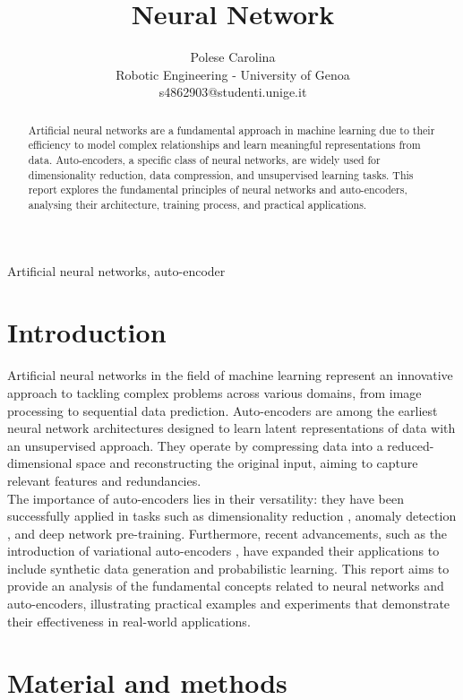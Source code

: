\documentclass[9pt,technote]{IEEEtran}
\title{Neural Network}
\author{
	Polese Carolina\\
	Robotic Engineering - University of Genoa\\
	s4862903@studenti.unige.it
}
\begin{document}
\maketitle

\begin{abstract}
Artificial neural networks are a fundamental approach in machine learning due to their efficiency to model complex relationships and learn meaningful representations from data. Auto-encoders, a specific class of neural networks, are widely used for dimensionality reduction, data compression, and unsupervised learning tasks. This report explores the fundamental principles of neural networks and auto-encoders, analysing their architecture, training process, and practical applications.
\end{abstract}
\begin{IEEEkeywords}
Artificial neural networks, auto-encoder
\end{IEEEkeywords}

\section{Introduction}
Artificial neural networks in the field of machine learning represent an innovative approach to tackling complex problems across various domains, from image processing to sequential data prediction. Auto-encoders are among the earliest neural network architectures designed to learn latent representations of data with an unsupervised approach. They operate by compressing data into a reduced-dimensional space and reconstructing the original input, aiming to capture relevant features and redundancies. \\
The importance of auto-encoders lies in their versatility: they have been successfully applied in tasks such as dimensionality reduction \cite{Hilton2006}, anomaly detection \cite{Chalapathy2019DeepLF}, and deep network pre-training. Furthermore, recent advancements, such as the introduction of variational auto-encoders \cite{Kingma2013AutoEncodingVB}, have expanded their applications to include synthetic data generation and probabilistic learning. This report aims to provide an analysis of the fundamental concepts related to neural networks and auto-encoders, illustrating practical examples and experiments that demonstrate their effectiveness in real-world applications.
\section{Material and methods}
\end{document}
